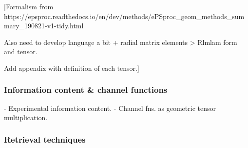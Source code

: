 [Formalism from https://epsproc.readthedocs.io/en/dev/methods/ePSproc_geom_methods_summary_190821-v1-tidy.html

Also need to develop language a bit + radial matrix elements > Rlmlam form and tensor.

Add appendix with definition of each tensor.]

\subsubsection{Information content \& channel functions}

- Experimental information content.
- Channel fns. as geometric tensor multiplication.


\subsubsection{Retrieval techniques}

